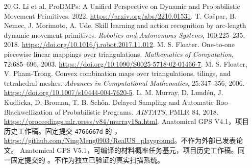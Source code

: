 \documentclass[UTF8,11pt,a4paper,fontset=fandol]{ctexart}
\numberwithin{equation}{section}
\theoremstyle{definition}
\begin{document}
\begin{thebibliography}{20}
 G. Li et al. ProDMPs: A Unified Perspective on Dynamic and Probabilistic Movement Primitives. 2022. \url{https://arxiv.org/abs/2210.01531}.
 T. Ga\v{s}par, B. Nemec, J. Morimoto, A. Ude. Skill learning and action recognition by arc-length dynamic movement primitives. \emph{Robotics and Autonomous Systems}, 100:225--235, 2018. \url{https://doi.org/10.1016/j.robot.2017.11.012}.
 M. S. Floater. One-to-one piecewise linear mappings over triangulations. \emph{Mathematics of Computation}, 72:685--696, 2003. \url{https://doi.org/10.1090/S0025-5718-02-01466-7}.
 M. S. Floater, V. Pham-Trong. Convex combination maps over triangulations, tilings, and tetrahedral meshes. \emph{Advances in Computational Mathematics}, 25:347--356, 2006. \url{https://doi.org/10.1007/s10444-004-7620-5}.
 L. M. Murray, D. Lund\'en, J. Kudlicka, D. Broman, T. B. Sch\"on. Delayed Sampling and Automatic Rao--Blackwellization of Probabilistic Programs. \emph{AISTATS}, PMLR 84, 2018. \url{https://proceedings.mlr.press/v84/murray18a.html}.
 Anatomical GPS V4.1，项目历史工作稿。固定提交 \texttt{4766667d} 的 ，\url{https://github.com/NingMeng0903/RealUS_playground}。不作为外部已发表论文。
 Anatomical GPS V5.1，可编译的材料概率任务基元，项目历史工作稿。同一固定提交的 。不作为独立已验证的真实扫描系统。
\end{thebibliography}
\end{document}
